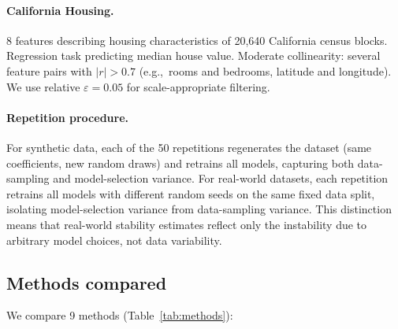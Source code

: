 \documentclass[11pt]{article}
\newcommand{\eg}{e.g.,\ }
\begin{document}
\paragraph{California Housing.}
8 features describing housing characteristics of 20,640 California
census blocks. Regression task predicting median house value. Moderate
collinearity: several feature pairs with $|r| > 0.7$ (\eg rooms and
bedrooms, latitude and longitude).
We use relative $\varepsilon = 0.05$ for scale-appropriate filtering.

\paragraph{Repetition procedure.}
For synthetic data, each of the 50 repetitions regenerates the dataset
(same coefficients, new random draws) and retrains all models, capturing
both data-sampling and model-selection variance. For real-world datasets,
each repetition retrains all models with different random seeds on the
same fixed data split, isolating model-selection variance from
data-sampling variance. This distinction means that real-world stability
estimates reflect only the instability due to arbitrary model choices,
not data variability.

\subsection{Methods compared}

We compare 9 methods (Table~\ref{tab:methods}):
\end{document}
